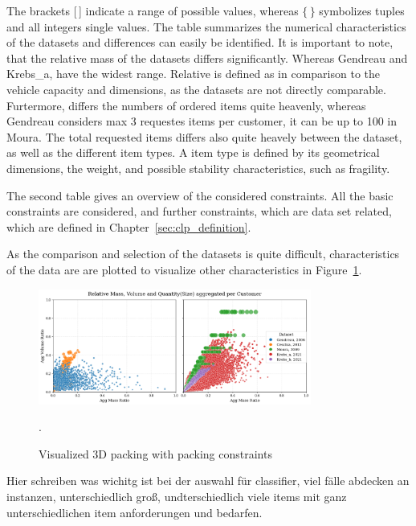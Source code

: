 \clearpage


The brackets [\,] indicate a range of possible values, whereas $\{\,\}$ symbolizes tuples and all integers
single values. The table summarizes the numerical characteristics of the datasets and differences
can easily be identified. It is important to note, that the relative mass of the datasets differs
significantly. Whereas Gendreau and Krebs\_a, have the widest range. Relative is defined as in
comparison to the vehicle capacity and dimensions, as the datasets are not directly comparable.
Furtermore, differs the numbers of ordered items quite heavenly, whereas Gendreau
considers max 3 requestes items per customer, it can be up to 100 in Moura.
The total requested items differs also quite heavely between the dataset, as well as the different item types. A item type is defined
by its geometrical dimensions, the weight, and possible stability characteristics, such as fragility.


The second table gives an overview of the considered constraints. All the basic constraints are considered,
and further constraints, which are data set related, which are defined in Chapter~\ref{sec:clp_definition}.

As the comparison and selection of the datasets is quite difficult, characteristics of the data are are plotted
to visualize other characteristics in Figure~\ref{fig:dataset_comparison}.
\begin{figure}[ht]
    \centering
    \includegraphics[width=0.8\textwidth]{pictures/comparison_datasets_3lcvrp.png}
    \caption{Visualized 3D packing with packing constraints}.
    \label{fig:dataset_comparison}
\end{figure}

Hier schreiben was wichitg ist bei der auswahl für classifier, viel fälle abdecken an instanzen,
unterschiedlich groß, undterschiedlich viele items mit ganz unterschiedlichen item anforderungen
und bedarfen.

